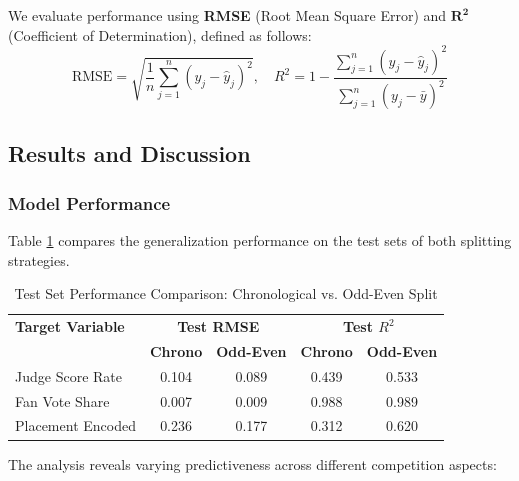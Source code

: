 We evaluate performance using \textbf{RMSE} (Root Mean Square Error) and $\mathbf{R^2}$ (Coefficient of Determination), defined as follows:
\begin{equation}
    \text{RMSE} = \sqrt{\frac{1}{n} \sum_{j=1}^n (y_j - \hat{y}_j)^2}, \quad R^2 = 1 - \frac{\sum_{j=1}^n (y_j - \hat{y}_j)^2}{\sum_{j=1}^n (y_j - \bar{y})^2} 
\end{equation}

\subsection{Results and Discussion}

\subsubsection{Model Performance}
Table \ref{tab:model_results} compares the generalization performance on the test sets of both splitting strategies.

\begin{table}[h]
\centering
\caption{Test Set Performance Comparison: Chronological vs. Odd-Even Split}
\label{tab:model_results}
\begin{tabular}{lcccc}
\toprule
\textbf{Target Variable} & \multicolumn{2}{c}{\textbf{Test RMSE}} & \multicolumn{2}{c}{\textbf{Test $R^2$}} \\
 & \textbf{Chrono} & \textbf{Odd-Even} & \textbf{Chrono} & \textbf{Odd-Even} \\
\midrule
Judge Score Rate & 0.104 & 0.089 & 0.439 & 0.533 \\
Fan Vote Share & 0.007 & 0.009 & 0.988 & 0.989 \\
Placement Encoded & 0.236 & 0.177 & 0.312 & 0.620 \\
\bottomrule
\end{tabular}
\end{table}

The analysis reveals varying predictiveness across different competition aspects:

